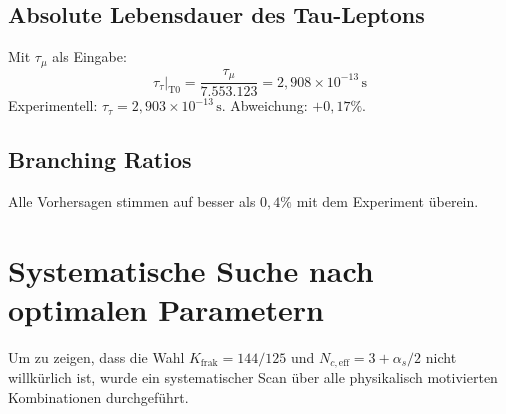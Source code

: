 	\subsection{Absolute Lebensdauer des Tau-Leptons}
	
	Mit $\tau_\mu$ als Eingabe:
	\begin{equation}
		\tau_\tau\big|_\text{T0} = \frac{\tau_\mu}{7{.}553{.}123} = 2{,}908 \times 10^{-13} \, \text{s}
	\end{equation}
	Experimentell: $\tau_\tau = 2{,}903 \times 10^{-13} \, \text{s}$. Abweichung: $+0{,}17\%$.
	
	\subsection{Branching Ratios}
	
	\begin{table}[h]
		\centering
		\caption{Vergleich T0-Vorhersage mit experimentellen Werten. $\alpha_s$ aus T0-Geometrie.}
		\label{tab:results}
	\end{table}
	
	Alle Vorhersagen stimmen auf besser als $0{,}4\%$ mit dem Experiment überein.
	
	
	\section{Systematische Suche nach optimalen Parametern}
	
	Um zu zeigen, dass die Wahl $K_\text{frak} = 144/125$ und $N_{c,\text{eff}} = 3 + \alpha_s/2$ nicht willkürlich ist, wurde ein systematischer Scan über alle physikalisch motivierten Kombinationen durchgeführt.
	
